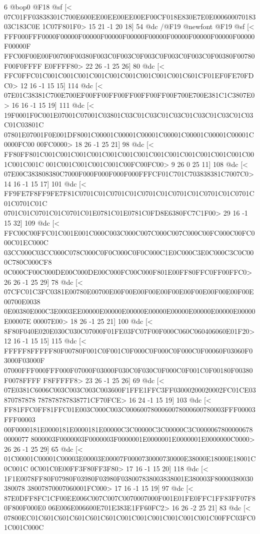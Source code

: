 {{{{{{{{{{{{{{{{{{{{{{{6 @bop0
@F18 @sf
[<
07C01FF03838301C700E600EE00EE00EE00EF00CF018E830E7E0E00060007018303C183C0E
1C07F801F0>
	 15 21 -1 20 18] 54 @dc
/@F19 @newfont
@F19 @sf
[<
FFF000FFF0000F00000F00000F00000F00000F00000F00000F00000F00000F00000F00000F
FFC00F00E00F00700F00380F003C0F003C0F003C0F003C0F003C0F00380F00780F00F0FFFF
E0FFFF80>
	 22 26 -1 25 26] 80 @dc
[<
FFC0FFC01C001C001C001C001C001C001C001C001C001C601CF01EF0FE70FDC0>
	 12 16 -1 15 15] 114 @dc
[<
07E01C38381C700E700EF00FF00FF00FF00FF00FF00F700E700E381C1C3807E0>
	 16 16 -1 15 19] 111 @dc
[<
19F0001F0C001E07001C07001C03801C03C01C03C01C03C01C03C01C03C01C03C01C03801C
07801E07001F0E001DF8001C00001C00001C00001C00001C00001C00001C00001C0000FC00
00FC0000>
	 18 26 -1 25 21] 98 @dc
[<
FF80FF801C001C001C001C001C001C001C001C001C001C001C001C001C001C001C001C001C
001C001C001C001C001C00FC00FC00>
	 9 26 0 25 11] 108 @dc
[<
07E00C383808380C7000F000F000F000F000FFFCF01C701C703838381C7007C0>
	 14 16 -1 15 17] 101 @dc
[<
FF9FE7F8FF9FE7F81C0701C01C0701C01C0701C01C0701C01C0701C01C0701C01C0701C01C
0701C01C0701C01C0701C01E0781C01E0781C0FD8E6380FC7C1F00>
	 29 16 -1 15 32] 109 @dc
[<
FFC00C00FFC01C001E001C000C003C000C007C000C007C000C00FC000C00FC000C01EC000C
03CC000C03CC000C078C000C0F0C000C0F0C000C1E0C000C3E0C000C3C0C000C780C000CF8
0C000CF00C000DE00C000DE00C000FC00C000F801E00FF80FFC0FF00FFC0>
	 26 26 -1 25 29] 78 @dc
[<
07CFC01C3FC0381E00780E00700E00F00E00F00E00F00E00F00E00F00E00F00E00700E0038
0E00380E000C3E0003EE00000E00000E00000E00000E00000E00000E00000E00000E00007E
00007E00>
	 18 26 -1 25 21] 100 @dc
[<
8F80F040E020E030C030C07000F01FE03FC07F00F000C060C060406060E01F20>
	 12 16 -1 15 15] 115 @dc
[<
FFFFF8FFFFF80F00780F001C0F001C0F000C0F000C0F000C0F00060F03060F03000F03000F
07000FFF000FFF000F07000F03000F030C0F030C0F000C0F001C0F00180F00380F0078FFFF
F8FFFFF8>
	 23 26 -1 25 26] 69 @dc
[<
07E0381C6006C003C003C003C003600F1FFE1FFC3FF03000200020002FC01CE03870787878
787878787838771CF70FCE>
	 16 24 -1 15 19] 103 @dc
[<
FF81FFC0FF81FFC01E003C000C003C0006007800060078000600780003FFF00003FFF00003
00F0000181E0000181E0000181E00000C3C00000C3C00000C3C00000678000006780000077
8000003F0000003F0000003F0000001E0000001E0000001E0000000C0000>
	 26 26 -1 25 29] 65 @dc
[<
01C00001C00001C00003E00003E00007F0000730000730000E38000E18000E18001C0C001C
0C001C0E00FF3F80FF3F80>
	 17 16 -1 15 20] 118 @dc
[<
1F1E0078FF80F07980F03980F03980F038007838003838001E380003F80000380030380078
38007870007060001FC000>
	 17 16 -1 15 19] 97 @dc
[<
87E0DFF8FC1CF00EE006C007C007C0070007000F001E01FE0FFC1FF83FF07F80F800F000E0
06E006E006600E701E383E1FF60FC2>
	 16 26 -2 25 21] 83 @dc
[<
07800EC01C601C601C601C601C601C001C001C001C001C001C001C00FFC03FC01C001C000C
}}}}}}}}}}}}}}}}}}}}}}}
